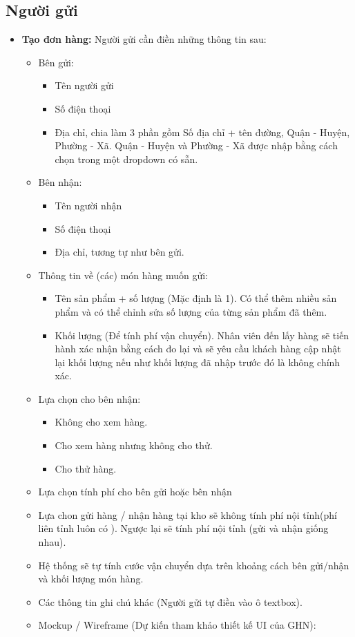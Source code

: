 \begin{itemize}
	\subsection{Người gửi}
	\begin{itemize}
		\item \textbf{Tạo đơn hàng:} Người gửi cần điền những thông tin sau: 
		\begin{itemize}
			\item Bên gửi:
			\begin{itemize}
				\item Tên người gửi
				\item Số điện thoại
				\item Địa chỉ, chia làm 3 phần gồm Số địa chỉ + tên đường, Quận - Huyện, Phường - Xã. Quận - Huyện và Phường - Xã được nhập bằng cách chọn trong một dropdown có sẵn.
			\end{itemize}
			\item Bên nhận:
			\begin{itemize}
				\item Tên người nhận
				\item Số điện thoại
				\item Địa chỉ, tương tự như bên gửi.
			\end{itemize}
			\item Thông tin về (các) món hàng muốn gửi:
			\begin{itemize}
				\item Tên sản phẩm + số lượng (Mặc định là 1). Có thể thêm nhiều sản phẩm và có thể chỉnh sửa số lượng của từng sản phẩm đã thêm.
				\item Khối lượng (Để tính phí vận chuyển). Nhân viên đến lấy hàng sẽ tiến hành xác nhận bằng cách đo lại và sẽ yêu cầu khách hàng cập nhật lại khối lượng nếu như khối lượng đã nhập trước đó là không chính xác.
				
			\end{itemize}
			\item Lựa chọn cho bên nhận:
			\begin{itemize}
				\item Không cho xem hàng.
				\item Cho xem hàng nhưng không cho thử.
				\item Cho thử hàng.
			\end{itemize}
			\item Lựa chọn tính phí cho bên gửi hoặc bên nhận 
			\item Lựa chon gửi hàng / nhận hàng tại kho sẽ không tính phí nội tỉnh(phí liên tỉnh luôn có ). Ngược lại sẽ tính phí nội tỉnh (gửi và nhận giống nhau). 
			\item Hệ thống sẽ tự tính cước vận chuyển dựa trên khoảng cách bên gửi/nhận và khối lượng món hàng.
			\item Các thông tin ghi chú khác (Người gửi tự điền vào ô textbox).
			\item Mockup / Wireframe (Dự kiến tham khảo thiết kế UI của GHN):
		\end{itemize} 
		

\end{itemize}
\end{itemize}
